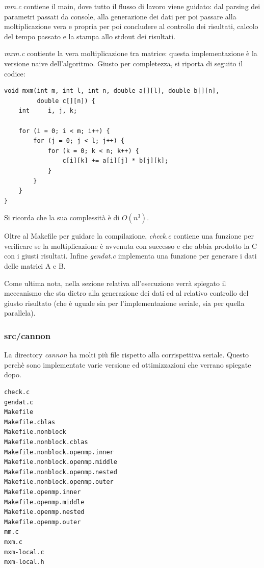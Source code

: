 \textit{mm.c} contiene il main, dove tutto il flusso di lavoro viene guidato: dal parsing dei parametri passati da console, alla generazione dei dati per poi passare alla moltiplicazione vera e propria per poi concludere al controllo dei risultati, calcolo del tempo passato e la stampa allo stdout dei risultati.

\textit{mxm.c} contiente la vera moltiplicazione tra matrice: questa implementazione \`{e} la versione naive dell'algoritmo. Giusto per completezza, si riporta di seguito il codice:

\begin{lstlisting}
void mxm(int m, int l, int n, double a[][l], double b[][n],
         double c[][n]) {
    int     i, j, k;

    for (i = 0; i < m; i++) {
        for (j = 0; j < l; j++) {
            for (k = 0; k < n; k++) {
                c[i][k] += a[i][j] * b[j][k];
            }
        }
    }
}
\end{lstlisting}

Si ricorda che la sua complessit\`{a} \`{e} di $O(n^3)$.

Oltre al Makefile per guidare la compilazione, \textit{check.c} contiene una funzione per verificare se la moltiplicazione \`{e} avvenuta con successo e che abbia prodotto la C con i giusti risultati. Infine \textit{gendat.c} implementa una funzione per generare i dati delle matrici A e B.

Come ultima nota, nella sezione relativa all'esecuzione verr\`{a} spiegato il meccanismo che sta dietro alla generazione dei dati ed al relativo controllo del giusto risultato (che \`{e} uguale sia per l'implementazione seriale, sia per quella parallela).

\subsubsection{src/cannon}
La directory \textit{cannon} ha molti pi\`{u} file rispetto alla corrispettiva seriale. Questo perch\`{e} sono implementate varie versione ed ottimizzazioni che verrano spiegate dopo.

\begin{lstlisting}
check.c
gendat.c
Makefile
Makefile.cblas
Makefile.nonblock
Makefile.nonblock.cblas
Makefile.nonblock.openmp.inner
Makefile.nonblock.openmp.middle
Makefile.nonblock.openmp.nested
Makefile.nonblock.openmp.outer
Makefile.openmp.inner
Makefile.openmp.middle
Makefile.openmp.nested
Makefile.openmp.outer
mm.c
mxm.c
mxm-local.c
mxm-local.h
\end{lstlisting}

